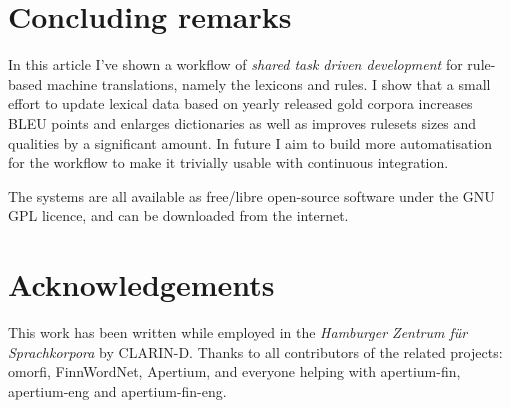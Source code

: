 \documentclass[free]{flammie}
\begin{document}
\section{Concluding remarks}
\label{sec:conclusions}

In this article I've shown a workflow of \textit{shared task driven
development} for rule-based machine translations, namely the lexicons and rules.
I show that a small effort to update lexical data based on yearly released gold
corpora increases BLEU points and enlarges dictionaries as well as improves
rulesets sizes and qualities by a significant amount. In future I aim to build
more automatisation for the workflow to make it trivially usable with continuous
integration.

The systems are all available as free/libre open-source software under the GNU
GPL licence, and can be downloaded from the internet.

\section*{Acknowledgements}
\label{sec:acknowlegdements}

This work has been written while employed in the \textit{Hamburger Zentrum f\"ur
Sprachkorpora} by CLARIN-D. Thanks to all contributors of the related projects:
omorfi, FinnWordNet, Apertium, and everyone helping with
apertium-fin, apertium-eng and apertium-fin-eng.




\end{document}

